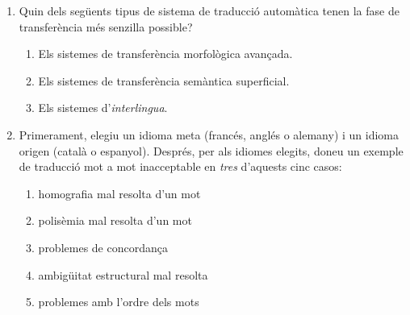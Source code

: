\begin{enumerate}
\item Quin dels següents tipus de sistema de traducció automàtica
  tenen la fase de transferència més senzilla possible?
  \begin{enumerate}
  \item Els sistemes de transferència morfològica avançada.
  \item Els sistemes de transferència semàntica superficial.
  \item Els sistemes d'\emph{interlingua}.
  \end{enumerate}

\item Primerament, elegiu un idioma meta (francés, anglés o alemany) i
  un idioma origen (català o espanyol). Després, per als idiomes
  elegits, doneu un exemple de traducció mot a mot inacceptable en
  \emph{tres} d'aquests cinc casos:
  \begin{enumerate}
  \item homografia mal resolta d'un mot
  \item polisèmia mal resolta d'un mot
  \item problemes de concordança
  \item ambigüitat estructural mal resolta
  \item problemes amb l'ordre dels mots
  \end{enumerate}
      

\end{enumerate}
